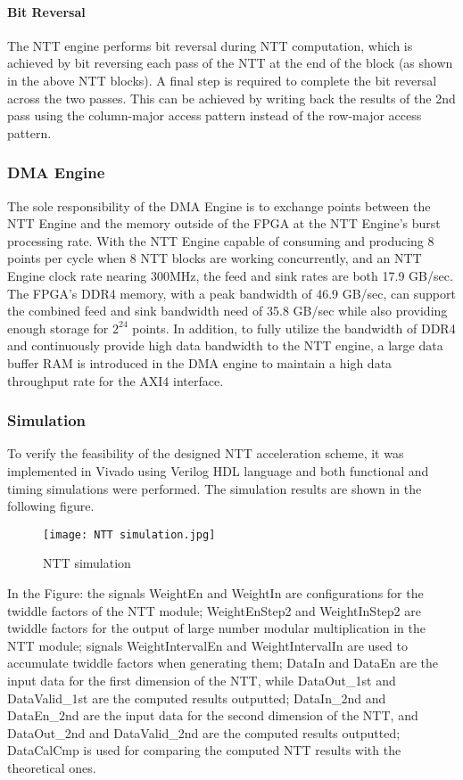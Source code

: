 \paragraph{Bit Reversal}
The NTT engine performs bit reversal during NTT computation, which is achieved by bit reversing each pass of the NTT at the end of the block (as shown in the above NTT blocks). A final step is required to complete the bit reversal across the two passes. This can be achieved by writing back the results of the 2nd pass using the column-major access pattern instead of the row-major access pattern.


\subsubsection{DMA Engine}

The sole responsibility of the DMA Engine is to exchange points between the NTT Engine and the memory outside of the FPGA at the NTT Engine's burst processing rate. With the NTT Engine capable of consuming and producing 8 points per cycle when 8 NTT blocks are working concurrently, and an NTT Engine clock rate nearing 300MHz, the feed and sink rates are both 17.9 GB/sec. The FPGA's DDR4 memory, with a peak bandwidth of 46.9 GB/sec, can support the combined feed and sink bandwidth need of 35.8 GB/sec while also providing enough storage for $2^{24}$ points.
  In addition, to fully utilize the bandwidth of DDR4 and continuously provide high data bandwidth to the NTT engine, a large data buffer RAM is introduced in the DMA engine to maintain a high data throughput rate for the AXI4 interface.

\subsubsection{Simulation}

To verify the feasibility of the designed NTT acceleration scheme, it was implemented in Vivado using Verilog HDL language and both functional and timing simulations were performed. The simulation results are shown in the following figure.

\begin{figure}[h]
  \centering
  \texttt{[image: NTT simulation.jpg]}
  \caption{NTT simulation}
  \label{fig:NTT_Simu}
\end{figure}

In the Figure: the signals WeightEn and WeightIn are configurations for the twiddle factors of the NTT module; WeightEnStep2 and WeightInStep2 are twiddle factors for the output of large number modular multiplication in the NTT module; signals WeightIntervalEn and WeightIntervalIn are used to accumulate twiddle factors when generating them; DataIn and DataEn are the input data for the first dimension of the NTT, while DataOut\_1st and DataValid\_1st are the computed results outputted; DataIn\_2nd and DataEn\_2nd are the input data for the second dimension of the NTT, and DataOut\_2nd and DataValid\_2nd are the computed results outputted; DataCalCmp is used for comparing the computed NTT results with the theoretical ones.

